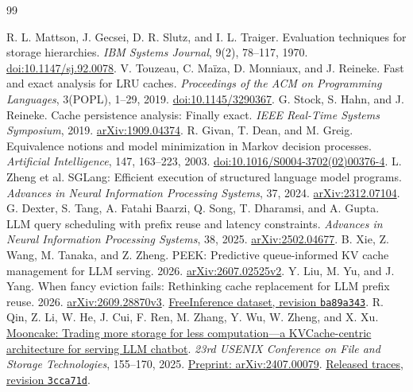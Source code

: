 \documentclass[11pt,letterpaper]{article}
\begin{document}
\begin{thebibliography}{99}

 R. L. Mattson, J. Gecsei, D. R. Slutz, and I. L. Traiger. Evaluation techniques for storage hierarchies. \emph{IBM Systems Journal}, 9(2), 78--117, 1970. \href{https://doi.org/10.1147/sj.92.0078}{doi:10.1147/sj.92.0078}.
 V. Touzeau, C. Maïza, D. Monniaux, and J. Reineke. Fast and exact analysis for LRU caches. \emph{Proceedings of the ACM on Programming Languages}, 3(POPL), 1--29, 2019. \href{https://doi.org/10.1145/3290367}{doi:10.1145/3290367}.
 G. Stock, S. Hahn, and J. Reineke. Cache persistence analysis: Finally exact. \emph{IEEE Real-Time Systems Symposium}, 2019. \href{https://arxiv.org/abs/1909.04374}{arXiv:1909.04374}.
 R. Givan, T. Dean, and M. Greig. Equivalence notions and model minimization in Markov decision processes. \emph{Artificial Intelligence}, 147, 163--223, 2003. \href{https://doi.org/10.1016/S0004-3702(02)00376-4}{doi:10.1016/S0004-3702(02)00376-4}.
 L. Zheng et al. SGLang: Efficient execution of structured language model programs. \emph{Advances in Neural Information Processing Systems}, 37, 2024. \href{https://arxiv.org/abs/2312.07104}{arXiv:2312.07104}.
 G. Dexter, S. Tang, A. Fatahi Baarzi, Q. Song, T. Dharamsi, and A. Gupta. LLM query scheduling with prefix reuse and latency constraints. \emph{Advances in Neural Information Processing Systems}, 38, 2025. \href{https://arxiv.org/abs/2502.04677}{arXiv:2502.04677}.
 B. Xie, Z. Wang, M. Tanaka, and Z. Zheng. PEEK: Predictive queue-informed KV cache management for LLM serving. 2026. \href{https://arxiv.org/abs/2607.02525v2}{arXiv:2607.02525v2}.
 Y. Liu, M. Yu, and J. Yang. When fancy eviction fails: Rethinking cache replacement for LLM prefix reuse. 2026. \href{https://arxiv.org/abs/2609.28870v3}{arXiv:2609.28870v3}. \href{https://huggingface.co/datasets/harvardMadsys/2026_prefixcache/tree/ba89a343a048073dda72617bb6087910da6214d0}{FreeInference dataset, revision \texttt{ba89a343}}.
 R. Qin, Z. Li, W. He, J. Cui, F. Ren, M. Zhang, Y. Wu, W. Zheng, and X. Xu. \href{https://www.usenix.org/conference/fast25/presentation/qin}{Mooncake: Trading more storage for less computation---a KVCache-centric architecture for serving LLM chatbot}. \emph{23rd USENIX Conference on File and Storage Technologies}, 155--170, 2025. \href{https://arxiv.org/abs/2407.00079}{Preprint: arXiv:2407.00079}. \href{https://github.com/kvcache-ai/Mooncake/tree/3cca71daccf2a7afb8fe3f0295358f70e3a69fdb/FAST25-release/traces}{Released traces, revision \texttt{3cca71d}}.

\end{thebibliography}
\end{document}
